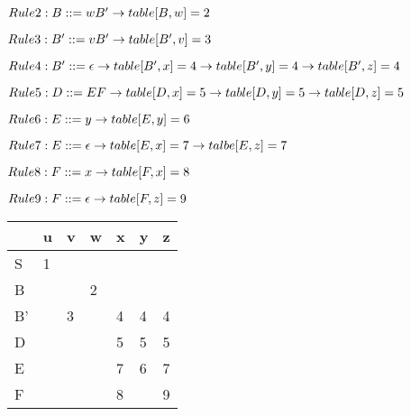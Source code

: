             $Rule 2: B::= wB'\\
            \rightarrow table[B,w] = 2$
            
            $Rule 3: B'::= vB'\\
            \rightarrow table[B',v] = 3$
            
            $Rule 4: B'::= \epsilon\\
            \rightarrow table[B',x] = 4\\
            \rightarrow table[B',y] = 4\\
            \rightarrow table[B',z] = 4$
            
            $Rule 5: D::= EF\\
            \rightarrow table[D,x] = 5\\
            \rightarrow table[D,y] = 5\\
            \rightarrow table[D,z] = 5$
            
            $Rule 6: E::= y\\
            \rightarrow table[E,y] = 6$
            
            $Rule 7: E::= \epsilon\\
            \rightarrow table[E,x] = 7\\
            \rightarrow talbe[E,z] = 7$
            
            $Rule 8: F::= x\\
            \rightarrow table[F,x] = 8$
            
            $Rule 9: F::= \epsilon\\
            \rightarrow table[F,z] = 9$
            
            \begin{tabular}{ p{2cm} | p{2cm} | p{2cm} | p{2cm} | p{2cm} | p{2cm} | p{2cm}}
                \hline
                & u & v & w & x & y & z \\ \hline                        
                S & 1 & & & & & \\ \hline
                B & & & 2 & & & \\ \hline
                B' & & 3 & & 4 & 4 & 4 \\ \hline
                D & & & & 5 & 5 & 5 \\ \hline
                E & & & & 7 & 6 & 7 \\ \hline
                F & & & & 8 & & 9 \\
                \hline
            \end{tabular}
  

